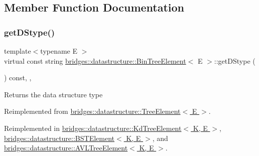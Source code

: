 \subsection{Member Function Documentation}
\mbox{\label{classbridges_1_1datastructure_1_1_bin_tree_element_aef86e3663785972251547e409fdc757b}} 
\subsubsection{\texorpdfstring{get\+D\+Stype()}{getDStype()}}
{\footnotesize\ttfamily template$<$typename E $>$ \\
virtual const string \hyperlink{classbridges_1_1datastructure_1_1_bin_tree_element}{bridges\+::datastructure\+::\+Bin\+Tree\+Element}$<$ E $>$\+::get\+D\+Stype (\begin{DoxyParamCaption}{ }\end{DoxyParamCaption}) const\hspace{0.3cm}{\ttfamily [inline]}, {\ttfamily [override]}, {\ttfamily [virtual]}}

\begin{DoxyReturn}{Returns}
the data structure type 
\end{DoxyReturn}


Reimplemented from \hyperlink{classbridges_1_1datastructure_1_1_tree_element_a897f34ea284da45e1dc869c3e3b6c9a4}{bridges\+::datastructure\+::\+Tree\+Element$<$ E $>$}.



Reimplemented in \hyperlink{classbridges_1_1datastructure_1_1_kd_tree_element_a76f6d9bfadfdec09d0a8564aa0e33235}{bridges\+::datastructure\+::\+Kd\+Tree\+Element$<$ K, E $>$}, \hyperlink{classbridges_1_1datastructure_1_1_b_s_t_element_a2bb8cc9ec4b6bc5b89ecef0f17be366f}{bridges\+::datastructure\+::\+B\+S\+T\+Element$<$ K, E $>$}, and \hyperlink{classbridges_1_1datastructure_1_1_a_v_l_tree_element_ab04d1e9ad4630e408041e8137dc9854a}{bridges\+::datastructure\+::\+A\+V\+L\+Tree\+Element$<$ K, E $>$}.

\mbox{\label{classbridges_1_1datastructure_1_1_bin_tree_element_ab30cfe373892c52709d5f1df013a0c82}} 
